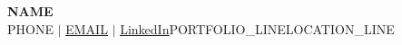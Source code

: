 \documentclass[letterpaper,11pt]{article}
\begin{document}
\begin{center}
    \textbf{\Huge \scshape {{NAME}}} \\ \vspace{4pt}
    \small
    {{PHONE}} $|$
    \href{mailto:{{EMAIL}}}{\underline{{{EMAIL}}}} $|$
    \href{{{LINKEDIN}}}{\underline{LinkedIn}}{{PORTFOLIO_LINE}}{{LOCATION_LINE}}
\end{center}

\end{document}
